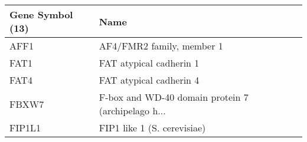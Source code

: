 \begin{tabular}{ll}
\toprule
Gene Symbol (13) &                                               Name \\
\midrule
            AFF1 &                          AF4/FMR2 family, member 1 \\
            FAT1 &                            FAT atypical cadherin 1 \\
            FAT4 &                            FAT atypical cadherin 4 \\
           FBXW7 & F-box and WD-40 domain protein 7 (archipelago h... \\
          FIP1L1 &                        FIP1 like 1 (S. cerevisiae) \\
\bottomrule
\end{tabular}
